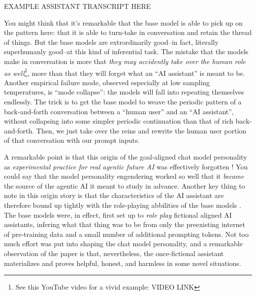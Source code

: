 EXAMPLE ASSISTANT TRANSCRIPT HERE

You might think that it's remarkable that the base model is able to pick up on
the pattern here: that it is able to turn-take in conversation and retain the
thread of things. But the base models are extrordinarily good--in fact,
literally superhumanly good--at this kind of inferential task. The mistake that
the models make in conversation is more that \emph{they may accidently take
over the human role as well}\footnote{See this YouTube video for a vivid
example: VIDEO LINK}, more than that they will forget what an ``AI assistant''
is meant to be. Another empirical failure mode, observed especially at low
sampling temperatures, is ``mode collapse'': the models will fall into
repeating themselves endlessly. The trick is to get the base model to weave the
periodic pattern of a back-and-forth conversation between a ``human user'' and
an ``AI assistant'', without collapsing into some simpler periodic continuation
than that of rich back-and-forth. Then, we just take over the reins and rewrite
the human user portion of that conversation with our prompt inputs.

A remarkable point is that this origin of the goal-aligned chat model
personality as \emph{experimental practice for real agentic future AI} was
effectively forgotten \cite{nostalgebraist2025void}! You could say that the
model personality engendering worked so well that it \emph{became} the source
of the agentic AI it meant to study in advance. Another key thing to note in
this origin story is that the characteristics of the AI assistant are therefore
bound up tightly with the role-playing abbilities of the base models
\cite{nostalgebraist2025void}. The base models were, in effect, first set up to
\emph{role play} fictional aligned AI assistants, infering what that thing was
to be from only the preexisting internet of pre-training data and a small
number of additional prompting tokens. Not too much effort was put into shaping
the chat model personality, and a remarkable observation of the paper is that,
nevertheless, the once-fictional assistant materializes and proves helpful,
honest, and harmless in some novel situations.

